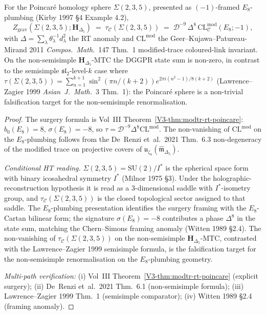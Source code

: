 \begin{theorem}
\label{thm:thqghr-rt-poincare}
For the Poincar\'e homology sphere $\Sigma(2, 3, 5)$, presented as
$(-1)$-framed $E_8$-plumbing (Kirby 1997 \S 4 Example 4.2),
\[
 Z_{\mathrm{grav}}(\Sigma(2, 3, 5); \mathbf H_{\Delta_5})
 \;=\;
 \tau_{\mathcal C}(\Sigma(2, 3, 5))
 \;=\;
 \mathcal D^{-9}\,\Delta^{8}\,
 \mathrm{CL}^{\mathrm{mod}}_{\mathcal C}(E_8; -1),
\]
with $\Delta = \sum_\lambda\theta_\lambda^{-1} d_\lambda^2$ the RT
anomaly and $\mathrm{CL}^{\mathrm{mod}}$ the Geer--Kujawa--Patureau-Mirand
2011 \emph{Compos.~Math.}~147 Thm.~1 modified-trace coloured-link
invariant. On the non-semisimple $\mathbf H_{\Delta_5}$-MTC the DGGPR
state sum is non-zero, in contrast to the semisimple
$\mathfrak{sl}_2$-level-$k$ case where
$\tau(\Sigma(2,3,5)) = \sum_{n=1}^{k+1}\sin^2(\pi n/(k+2))
e^{2\pi i(n^2-1)/8(k+2)}$ (Lawrence--Zagier 1999 \emph{Asian~J.~Math.}~3
Thm.~1): the Poincar\'e sphere is a non-trivial falsification target
for the non-semisimple renormalisation.
\end{theorem}

\begin{proof}
The surgery formula is Vol~III Theorem~\ref{V3-thm:modtr-rt-poincare}:
$b_0(E_8) = 8$, $\sigma(E_8) = -8$, so
$\tau = \mathcal D^{-9}\Delta^{8}\mathrm{CL}^{\mathrm{mod}}$. The
non-vanishing of $\mathrm{CL}^{\mathrm{mod}}$ on the $E_8$-plumbing
follows from the De~Renzi et~al.\ 2021 Thm.~6.3 non-degeneracy of the
modified trace on projective covers of
$\mathfrak u_{\zeta_8}(\widehat{\mathfrak m}_{\Delta_5})$.

\emph{Conditional HT reading.} $\Sigma(2, 3, 5) = \mathrm{SU}(2)/I^*$ is the
spherical space form with binary icosahedral symmetry $I^*$ (Milnor
1975 \S 3). Under the holographic-reconstruction hypothesis it is read
as a 3-dimensional saddle with $I^*$-isometry group, and
$\tau_{\mathcal C}(\Sigma(2, 3, 5))$ is the closed topological sector
assigned to that saddle. The $E_8$-plumbing presentation identifies the
surgery framing with the $E_8$-Cartan bilinear form; the signature
$\sigma(E_8) = -8$ contributes a phase $\Delta^{8}$ in the state sum,
matching the Chern--Simons framing anomaly (Witten 1989 \S 2.4). The
non-vanishing of
$\tau_{\mathcal C}(\Sigma(2, 3, 5))$ on the non-semisimple
$\mathbf H_{\Delta_5}$-MTC, contrasted with the Lawrence--Zagier 1999
semisimple formula, is the falsification target for the
non-semisimple renormalisation on the $E_8$-plumbing geometry.

\emph{Multi-path verification:}
(i) Vol~III Theorem~\ref{V3-thm:modtr-rt-poincare} (explicit surgery);
(ii) De~Renzi et~al.\ 2021 Thm.~6.1 (non-semisimple formula);
(iii) Lawrence--Zagier 1999 Thm.~1 (semisimple comparator);
(iv) Witten 1989 \S 2.4 (framing anomaly).
\end{proof}

